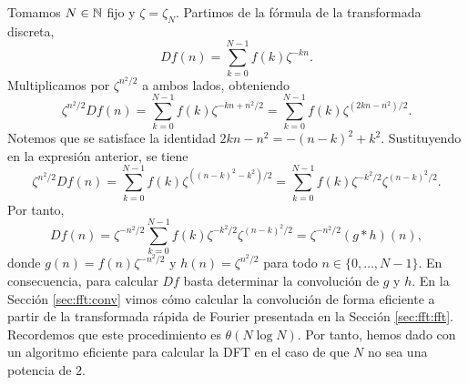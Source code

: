 \documentclass{article}
\begin{document}
Tomamos $N \in \mathbb{N}$ fijo y $\zeta = \zeta_N$. Partimos de la fórmula de la transformada discreta,
\[ Df(n) = \sum_{k=0}^{N-1} f(k) \zeta^{-kn}. \]
Multiplicamos por $\zeta^{n^2/2}$ a ambos lados, obteniendo
\[ \zeta^{n^2/2}Df(n) = \sum_{k=0}^{N-1}f(k)\zeta^{-kn+n^2/2} = \sum_{k=0}^{N-1}f(k)\zeta^{(2kn - n^2)/2}. \]
Notemos que se satisface la identidad $2kn -n^2 = -(n-k)^2 + k^2$. Sustituyendo en la expresión anterior, se tiene
\[ \zeta^{n^2/2}Df(n) = \sum_{k=0}^{N-1}f(k) \zeta^{((n-k)^2 - k^2)/2} = \sum_{k=0}^{N-1}f(k)\zeta^{-k^2/2}\zeta^{(n-k)^2/2}. \]
Por tanto,
\[ Df(n) = \zeta^{-n^2/2} \sum_{k=0}^{N-1}f(k) \zeta^{ - k^2/2}\zeta^{(n-k)^2/2} = \zeta^{-n^2/2}(g \ast h)(n), \]
donde $g(n) = f(n) \zeta^{-n^2/2}$ y $h(n) = \zeta^{n^2/2}$ para todo $n \in \{0, \ldots, N-1\}$. En consecuencia, para calcular $Df$ basta determinar la convolución de $g$ y $h$. En la Sección \ref{sec:fft:conv} vimos cómo calcular la convolución de forma eficiente a partir de la transformada rápida de Fourier presentada en la Sección \ref{sec:fft:fft}. Recordemos que este procedimiento es $\theta(N \log N)$. Por tanto, hemos dado con un algoritmo eficiente para calcular la DFT en el caso de que $N$ no sea una potencia de $2$. 
\end{document}
